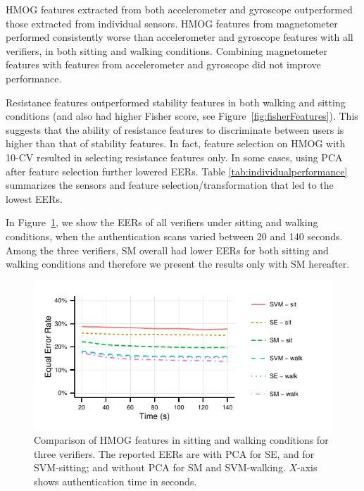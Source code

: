 %
%
%
HMOG features extracted from both accelerometer and gyroscope outperformed those extracted from individual sensors. %
HMOG features from magnetometer performed consistently worse than accelerometer and gyroscope features with all verifiers, in both sitting and walking conditions. Combining magnetometer features with features from accelerometer and gyroscope did not improve performance.

%
Resistance features outperformed stability features in both walking and sitting conditions (and also had higher Fisher score, see Figure~\ref{fig:fisherFeatures}). This suggests that the ability of resistance features to discriminate between users is higher than that of stability features. In fact, feature selection on HMOG with 10-CV  resulted in selecting resistance features only.
%
In some cases, using PCA after feature selection further lowered EERs. Table \ref{tab:individualperformance} summarizes the sensors and feature selection/transformation that led to the lowest EERs.


%
%

%
%

%

%

%





%
%
%
%


%
%
%
%
%
%
%

%

In Figure~\ref{fig:hmogAllVerifiersSitWalk}, we show the EERs of all verifiers under sitting and walking conditions, when the authentication scans varied between 20 and 140 seconds. Among the three verifiers, SM overall had lower EERs for both sitting and walking conditions and therefore we present the results only with SM hereafter. %
%
%

\begin{figure}[t]
\includegraphics[width=1\linewidth]{plots_R/auth_hmog_all_verifiers_new.pdf}
\caption[]{Comparison of HMOG features in sitting and walking conditions for three verifiers. The reported EERs are with PCA for SE, and for SVM-sitting; and without PCA for SM and SVM-walking. $X$-axis shows authentication time in seconds.}
%
\label{fig:hmogAllVerifiersSitWalk}
\end{figure}

